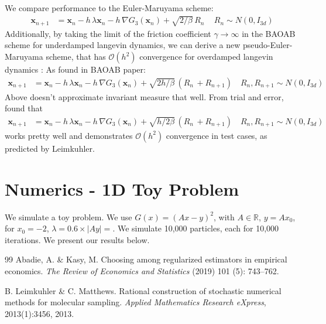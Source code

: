 \documentclass{article}
\renewcommand{\vec}[1]{{\mathbf{#1}}}
\begin{document}
We compare performance to the Euler-Maruyama scheme:
\begin{equation} 
\begin{split} 
\vec x_{n+1}&=\vec x_{n} - h \,\lambda \vec x_{n} - h\,\nabla G_{3}(\vec x_n) +\sqrt{2/\beta} \, R_n\, \quad R_n \sim N(0,I_{3d})
\label{euler}
\end{split}
\end{equation}
Additionally, by taking the limit of the friction coefficient $\gamma \to \infty$ in the BAOAB scheme for underdamped langevin dynamics, we can derive a new pseudo-Euler-Maruyama scheme, that has $\mathcal{O}(h^2)$ convergence for overdamped langevin dynamics \cite{leimkuhler_baoab}:
As found in BAOAB paper:
\begin{equation} 
\begin{split} 
\vec x_{n+1}&=\vec x_{n} - h \,\lambda \vec x_{n} - h\,\nabla G_{3}(\vec x_n) +\sqrt{2h/\beta} \, (R_n\, + R_{n+1}) \quad R_n, R_{n+1} \sim N(0,I_{3d})
\label{pseudo-euler}
\end{split}
\end{equation}
Above doesn't approximate invariant measure that well. From trial and error, found that
\begin{equation}
\begin{aligned}
\vec x_{n+1}&=\vec x_{n} - h \,\lambda \vec x_{n} - h\,\nabla G_{3}(\vec x_n) +\sqrt{h/2\beta} \, (R_n\, + R_{n+1}) \quad R_n, R_{n+1} \sim N(0,I_{3d})
\end{aligned}
\end{equation}
works pretty well and demonstrates $\mathcal{O}(h^2)$ convergence in test cases, as predicted by Leimkuhler.


\section{Numerics - 1D Toy Problem}
We simulate a toy problem. We use $G(x) = (Ax-y)^2$, with $A \in \mathbb{R}$, $y = Ax_0$, for $x_0 = -2$, $\lambda = 0.6 \times |Ay| = $. We simulate 10,000 particles, each for 10,000 iterations. We present our results below.






\begin{thebibliography}{99}
Abadie, A. \& Kasy, M. Choosing among regularized estimators in empirical economics. {\em The Review of Economics and Statistics} (2019) 101 (5): 743–762.

 B. Leimkuhler \& C. Matthews. Rational construction of stochastic numerical methods for molecular sampling. {\em Applied Mathematics Research eXpress}, 2013(1):3456, 2013.
\end{thebibliography}
\end{document}
